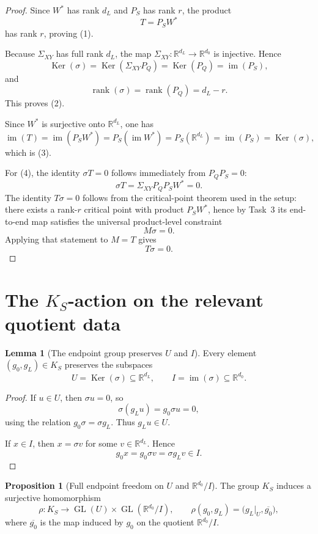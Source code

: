 \documentclass{article}
\newcommand{\rk}{\operatorname{rank}}
\newcommand{\GL}{\operatorname{GL}}
\newcommand{\R}{\mathbb{R}}
\newcommand{\im}{\operatorname{im}}
\newcommand{\Ker}{\operatorname{Ker}}
\theoremstyle{definition}
\newtheorem{proposition}[theorem]{Proposition}
\newtheorem{lemma}[theorem]{Lemma}
\begin{document}
\begin{proof}
Since $W^\ast$ has rank $d_L$ and $P_S$ has rank $r$, the product
\[
T=P_SW^\ast
\]
has rank $r$, proving (1).

Because $\Sigma_{XY}$ has full rank $d_L$, the map $\Sigma_{XY}:\R^{d_L}\to \R^{d_0}$ is injective. Hence
\[
\Ker(\sigma)=\Ker(\Sigma_{XY}P_Q)=\Ker(P_Q)=\im(P_S),
\]
and
\[
\rk(\sigma)=\rk(P_Q)=d_L-r.
\]
This proves (2).

Since $W^\ast$ is surjective onto $\R^{d_L}$, one has
\[
\im(T)=\im(P_SW^\ast)=P_S(\im W^\ast)=P_S(\R^{d_L})=\im(P_S)=\Ker(\sigma),
\]
which is (3).

For (4), the identity $\sigma T=0$ follows immediately from $P_QP_S=0$:
\[
\sigma T=\Sigma_{XY}P_QP_SW^\ast=0.
\]
The identity $T\sigma=0$ follows from the critical-point theorem used in the setup: there exists a rank-$r$ critical point with product $P_SW^\ast$, hence by Task~3 its end-to-end map satisfies the universal product-level constraint
\[
M\sigma=0.
\]
Applying that statement to $M=T$ gives
\[
T\sigma=0.
\]
\end{proof}

\section{The $K_S$-action on the relevant quotient data}

\begin{lemma}[The endpoint group preserves $U$ and $I$]\label{lem:preserves-U-I}
Every element $(g_0,g_L)\in K_S$ preserves the subspaces
\[
U=\Ker(\sigma)\subseteq \R^{d_L},
\qquad
I=\im(\sigma)\subseteq \R^{d_0}.
\]
\end{lemma}

\begin{proof}
If $u\in U$, then $\sigma u=0$, so
\[
\sigma(g_Lu)=g_0\sigma u=0,
\]
using the relation $g_0\sigma=\sigma g_L$. Thus $g_Lu\in U$.

If $x\in I$, then $x=\sigma v$ for some $v\in \R^{d_L}$. Hence
\[
g_0x=g_0\sigma v=\sigma g_Lv\in I.
\]
\end{proof}

\begin{proposition}[Full endpoint freedom on $U$ and $\R^{d_0}/I$]\label{prop:full-endpoint-freedom}
The group $K_S$ induces a surjective homomorphism
\[
\rho:K_S\to \GL(U)\times \GL(\R^{d_0}/I),
\qquad
\rho(g_0,g_L)=\bigl(g_L|_U,\overline{g_0}\bigr),
\]
where $\overline{g_0}$ is the map induced by $g_0$ on the quotient $\R^{d_0}/I$.
\end{proposition}
\end{document}
